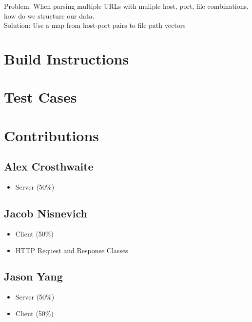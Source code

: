 \documentclass{article}
\begin{document}
Problem: When parsing multiple URLs with muliple host, port, file combinations, how do we structure our data. \\

\noindent
Solution: Use a map from host-port pairs to file path vectors

\section{Build Instructions}

\section{Test Cases}

\section{Contributions}

\subsection{Alex Crosthwaite}

\begin{itemize}
	\item Server (50\%)
\end{itemize}

\subsection{Jacob Nisnevich}

\begin{itemize}
	\item Client (50\%)
	\item HTTP Request and Response Classes
\end{itemize}

\subsection{Jason Yang}

\begin{itemize}
	\item Server (50\%)
	\item Client (50\%)
\end{itemize}
\end{document}
